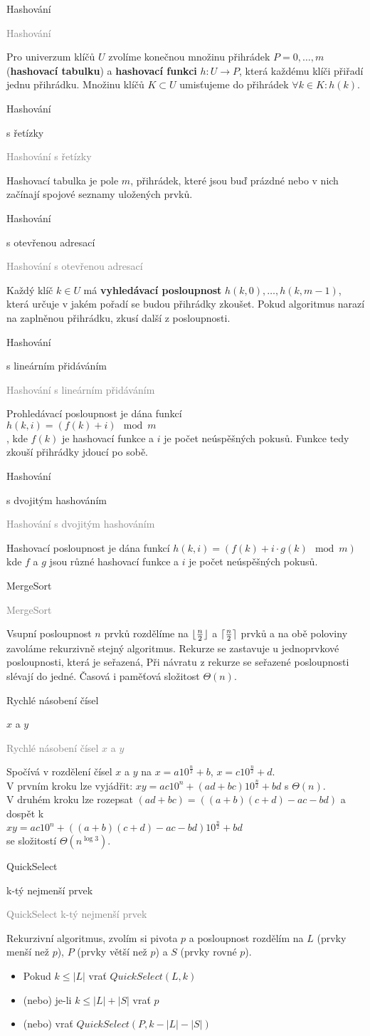 \documentclass[20pt]{extarticle}
\newcommand{\card}[3][]{
	\vspace*{\fill}

	\newpage
	\topskip0pt
	\vspace*{\fill}
		\Large #2

		\vspace{1cm}
		\normalsize #1
	\vspace*{\fill}
	\newpage

	\small \textcolor{gray}{#2 #1}
	\topskip0pt
	\vspace*{\fill}

	\normalsize
	#3
	\vspace*{\fill}
}
\DeclarePairedDelimiter{\ceil}{\lceil}{\rceil}
\DeclarePairedDelimiter{\floor}{\lfloor}{\rfloor}
\begin{document}
\begin{center}
\card{Hashování}{
	Pro univerzum klíčů $U$ zvolíme konečnou množinu přihrádek $P={0, \dots, m}$
	(\textbf{hashovací tabulku}) a \textbf{hashovací funkci} $h: U \to P$, která
	každému klíči přiřadí jednu přihrádku. Množinu klíčů $K \subset U$ umisťujeme
	do přihrádek $\forall k \in K: h(k)$.
}

\card[s řetízky]{Hashování}{
	Hashovací tabulka je pole $m$, přihrádek, které jsou buď prázdné nebo v nich
	začínají spojové seznamy uložených prvků.
}

\card[s otevřenou adresací]{Hashování}{
	Každý klíč $k \in U$ má \textbf{vyhledávací posloupnost} $h(k, 0), \dots, h(k, m-1)$,
	která určuje v jakém pořadí se budou přihrádky zkoušet. Pokud algoritmus narazí
	na zaplněnou přihrádku, zkusí další z posloupnosti.
}

\card[s lineárním přidáváním]{Hashování}{
	Prohledávací posloupnost je dána funkcí\\
	$h(k, i) = (f(k) + i) \mod m$\\, kde
	$f(k)$ je hashovací funkce a $i$ je počet neúspěšných pokusů. Funkce tedy zkouší
	přihrádky jdoucí po sobě.
}

\card[s dvojitým hashováním]{Hashování}{
	Hashovací posloupnost je dána funkcí $h(k, i) = (f(k) + i \cdot g(k) \mod m)$
	kde $f$ a $g$ jsou různé hashovací funkce a $i$ je počet neúspěšných pokusů.
}

\card{MergeSort}{
	Vsupní posloupnost $n$ prvků rozdělíme na $\floor{\frac{n}{2}}$ a $\ceil{\frac{n}{2}}$
	prvků a na obě poloviny zavoláme rekurzivně stejný algoritmus. Rekurze se zastavuje
	u jednoprvkové posloupnosti, která je seřazená, Při návratu z rekurze se seřazené
	posloupnosti slévají do jedné. Časová i paměťová složitost $\Theta(n)$.
}

\card[$x$ a $y$]{Rychlé násobení čísel}{
	Spočívá v rozdělení čísel $x$ a $y$ na $x=a10^{\frac{n}{2}} + b$, $x=c10^{\frac{n}{2}} + d$.\\
	V prvním kroku lze vyjádřit: $xy = ac10^n + (ad + bc)10^{\frac{n}{2}} + bd$ s $\Theta(n)$.\\
	V druhém kroku lze rozepsat $(ad + bc) = ((a+b)(c+d) - ac - bd)$ a dospět k\\
	$xy = ac10^n + ((a+b)(c+d) - ac - bd)10^{\frac{n}{2}} + bd$\\ se složitostí $\Theta(n^{\log 3})$.
}

\card[k-tý nejmenší prvek]{QuickSelect}{
	\small
	Rekurzivní algoritmus, zvolím si pivota $p$ a posloupnost rozdělím na $L$ (prvky menší
	než $p$), $P$ (prvky větší než $p$) a $S$ (prvky rovné $p$).
	\begin{itemize}
		\item Pokud $k \leq |L|$ vrať $QuickSelect(L, k)$
		\item (nebo) je-li $k \leq |L|+|S|$ vrať $p$
		\item (nebo) vrať $QuickSelect(P, k-|L|-|S|)$
	\end{itemize}
}


\end{center}
\end{document}
